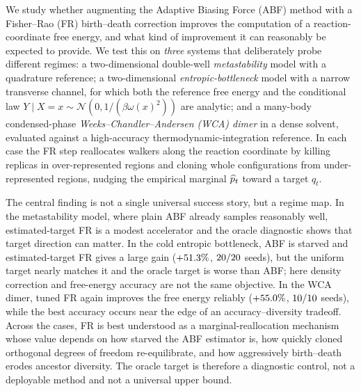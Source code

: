 We study whether augmenting the Adaptive Biasing Force (ABF) method with a
Fisher--Rao (FR) birth--death correction improves the computation of a
reaction-coordinate free energy, and what kind of improvement it can reasonably be
expected to provide. We test this on \emph{three} systems that deliberately probe
different regimes: a two-dimensional double-well \emph{metastability} model with a
quadrature reference; a two-dimensional \emph{entropic-bottleneck} model with a
narrow transverse channel, for which both the reference free energy and the
conditional law $Y\mid X=x\sim\mathcal N(0,1/(\beta\omega(x)^2))$ are analytic;
and a many-body condensed-phase \emph{Weeks--Chandler--Andersen (WCA) dimer} in a
dense solvent, evaluated against a high-accuracy thermodynamic-integration
reference. In each case the FR step reallocates walkers along the reaction
coordinate by killing replicas in over-represented regions and cloning whole
configurations from under-represented regions, nudging the empirical marginal
$\widehat{p}_t$ toward a target $q_t$.

The central finding is not a single universal success story, but a regime map. In
the metastability model, where plain ABF already samples reasonably well,
estimated-target FR is a modest accelerator and the oracle diagnostic shows that
target direction can matter. In the cold entropic bottleneck, ABF is starved and
estimated-target FR gives a large gain ($+51.3\%$, $20/20$ seeds),
but the uniform target nearly matches it and the oracle target is worse than ABF;
here density correction and free-energy accuracy are not the same objective. In
the WCA dimer, tuned FR again improves the free energy reliably
($+55.0\%$, $10/10$ seeds), while the best accuracy occurs
near the edge of an accuracy--diversity tradeoff. Across the cases, FR is best
understood as a marginal-reallocation mechanism whose value depends on how starved
the ABF estimator is, how quickly cloned orthogonal degrees of freedom
re-equilibrate, and how aggressively birth--death erodes ancestor diversity. The
oracle target is therefore a diagnostic control, not a deployable method and not a
universal upper bound.
